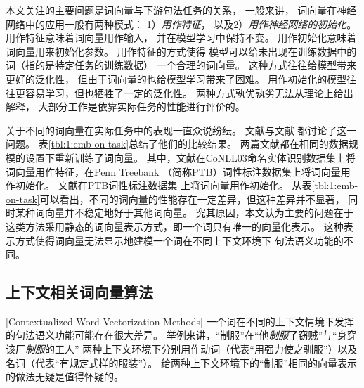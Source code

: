 本文关注的主要问题是词向量与下游句法任务的关系，
一般来讲，
词向量在神经网络中的应用一般有两种模式：
1）\textit{用作特征}，
以及2）\textit{用作神经网络的初始化}。
用作特征意味着词向量用作输入，
并在模型学习中保持不变。
用作初始化意味着词向量用来初始化参数。
用作特征的方式使得
模型可以给未出现在训练数据中的词（指的是特定任务的训练数据）
一个合理的词向量。
这种方式往往给模型带来更好的泛化性，
但由于词向量的也给模型学习带来了困难。
用作初始化的模型往往更容易学习，但也牺牲了一定的泛化性。
两种方式孰优孰劣无法从理论上给出解释，
大部分工作是依靠实际任务的性能进行评价的。

关于不同的词向量在实际任务中的表现一直众说纷纭。
文献与文献
都讨论了这一问题。
表\ref{tbl:1:emb-on-task}总结了他们的比较结果。
两篇文献都在相同的数据规模的设置下重新训练了词向量。
其中，文献在CoNLL03命名实体识别数据集\cite{TjongKimSang-DeMeulder:2003:CONLL}上将
词向量用作特征，在Penn Treebank （简称PTB）词性标注数据集\cite{Marcus93buildinga}上将词向量用作初始化。
文献在PTB词性标注数据集
上将词向量用作初始化。
从表\ref{tbl:1:emb-on-task}可以看出，不同的词向量的性能存在一定差异，但这种差异并不显著，
同时某种词向量并不稳定地好于其他词向量。
究其原因，本文认为主要的问题在于
这类方法采用静态的词向量表示方式，即一个词只有唯一的向量化表示。
这种表示方式使得词向量无法显示地建模一个词在不同上下文环境下
句法语义功能的不同。

\subsection{上下文相关词向量算法}[Contextualized Word Vectorization Methods]
一个词在不同的上下文情境下发挥的句法语义功能可能存在很大差异。
举例来讲，``制服''在``他\textit{制服}了窃贼''与``身穿该厂\textit{制服}的工人''
两种上下文环境下分别用作动词（代表``用强力使之驯服''）以及名词（代表``有规定式样的服装''）。
给两种上下文环境下的``制服''相同的向量表示的做法无疑是值得怀疑的。

